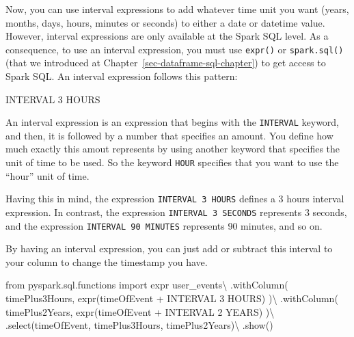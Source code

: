 \documentclass[
  11pt,
  letterpaper,
  DIV=11,
  numbers=noendperiod]{scrreprt}
\newenvironment{Shaded}{\begin{snugshade}}{\end{snugshade}}
\newcommand{\DataTypeTok}[1]{\textcolor[rgb]{0.68,0.00,0.00}{#1}}
\newcommand{\DecValTok}[1]{\textcolor[rgb]{0.68,0.00,0.00}{#1}}
\newcommand{\ImportTok}[1]{\textcolor[rgb]{0.00,0.46,0.62}{#1}}
\newcommand{\NormalTok}[1]{\textcolor[rgb]{0.00,0.23,0.31}{#1}}
\newcommand{\OperatorTok}[1]{\textcolor[rgb]{0.37,0.37,0.37}{#1}}
\newcommand{\StringTok}[1]{\textcolor[rgb]{0.13,0.47,0.30}{#1}}
\begin{document}
Now, you can use interval expressions to add whatever time unit you want
(years, months, days, hours, minutes or seconds) to either a date or
datetime value. However, interval expressions are only available at the
Spark SQL level. As a consequence, to use an interval expression, you
must use \texttt{expr()} or \texttt{spark.sql()} (that we introduced at
Chapter~\ref{sec-dataframe-sql-chapter}) to get access to Spark SQL. An
interval expression follows this pattern:

\begin{Shaded}
\begin{Highlighting}[]
\DataTypeTok{INTERVAL} \DecValTok{3}\NormalTok{ HOURS}
\end{Highlighting}
\end{Shaded}

An interval expression is an expression that begins with the
\texttt{INTERVAL} keyword, and then, it is followed by a number that
specifies an amount. You define how much exactly this amout represents
by using another keyword that specifies the unit of time to be used. So
the keyword \texttt{HOUR} specifies that you want to use the ``hour''
unit of time.

Having this in mind, the expression \texttt{INTERVAL\ 3\ HOURS} defines
a 3 hours interval expression. In contrast, the expression
\texttt{INTERVAL\ 3\ SECONDS} represents 3 seconds, and the expression
\texttt{INTERVAL\ 90\ MINUTES} represents 90 minutes, and so on.

By having an interval expression, you can just add or subtract this
interval to your column to change the timestamp you have.

\begin{Shaded}
\begin{Highlighting}[]
\ImportTok{from}\NormalTok{ pyspark.sql.functions }\ImportTok{import}\NormalTok{ expr}
\NormalTok{user\_events}\OperatorTok{\textbackslash{}}
\NormalTok{    .withColumn(}
        \StringTok{\textquotesingle{}timePlus3Hours\textquotesingle{}}\NormalTok{,}
\NormalTok{        expr(}\StringTok{\textquotesingle{}timeOfEvent + INTERVAL 3 HOURS\textquotesingle{}}\NormalTok{)}
\NormalTok{    )}\OperatorTok{\textbackslash{}}
\NormalTok{    .withColumn(}
        \StringTok{\textquotesingle{}timePlus2Years\textquotesingle{}}\NormalTok{,}
\NormalTok{        expr(}\StringTok{\textquotesingle{}timeOfEvent + INTERVAL 2 YEARS\textquotesingle{}}\NormalTok{)}
\NormalTok{    )}\OperatorTok{\textbackslash{}}
\NormalTok{    .select(}\StringTok{\textquotesingle{}timeOfEvent\textquotesingle{}}\NormalTok{, }\StringTok{\textquotesingle{}timePlus3Hours\textquotesingle{}}\NormalTok{, }\StringTok{\textquotesingle{}timePlus2Years\textquotesingle{}}\NormalTok{)}\OperatorTok{\textbackslash{}}
\NormalTok{    .show()}
\end{Highlighting}
\end{Shaded}
\end{document}
